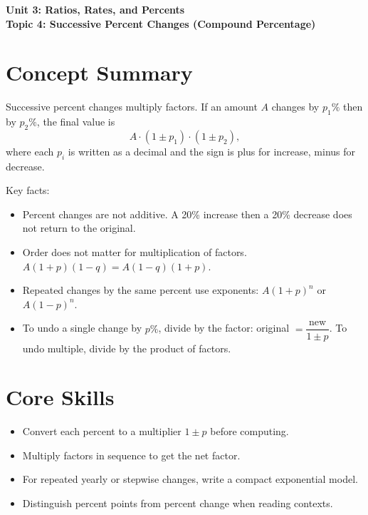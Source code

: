 \documentclass[14pt]{extarticle}
\begin{document}
\raggedright
{}

\begin{center}
    \LARGE \textbf{Unit 3: Ratios, Rates, and Percents} \\[6pt]
    \Large \textbf{Topic 4: Successive Percent Changes (Compound Percentage)}
\end{center}

\vspace{1em}

\section*{Concept Summary}

Successive percent changes multiply factors.  
If an amount \(A\) changes by \(p_1\%\) then by \(p_2\%\), the final value is
\[
A\cdot (1\pm p_1)\cdot (1\pm p_2),
\]
where each \(p_i\) is written as a decimal and the sign is plus for increase, minus for decrease.

Key facts:
\begin{itemize}
  \item Percent changes are not additive. A 20\% increase then a 20\% decrease does not return to the original.
  \item Order does not matter for multiplication of factors. \(A(1+p)(1-q) = A(1-q)(1+p)\).
  \item Repeated changes by the same percent use exponents: \(A(1+p)^n\) or \(A(1-p)^n\).
  \item To undo a single change by \(p\%\), divide by the factor: original \(=\dfrac{\text{new}}{1\pm p}\). To undo multiple, divide by the product of factors.
\end{itemize}

\section*{Core Skills}
\begin{itemize}
  \item Convert each percent to a multiplier \(1\pm p\) before computing.
  \item Multiply factors in sequence to get the net factor.
  \item For repeated yearly or stepwise changes, write a compact exponential model.
  \item Distinguish percent points from percent change when reading contexts.
\end{itemize}
\end{document}
